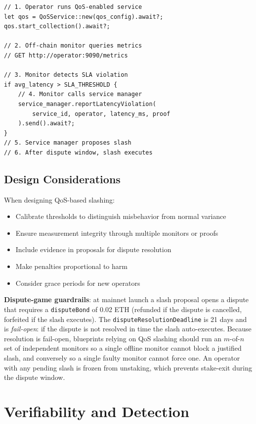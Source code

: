 \documentclass[11pt,a4paper]{article}
\begin{document}
\begin{lstlisting}
// 1. Operator runs QoS-enabled service
let qos = QoSService::new(qos_config).await?;
qos.start_collection().await?;

// 2. Off-chain monitor queries metrics
// GET http://operator:9090/metrics

// 3. Monitor detects SLA violation
if avg_latency > SLA_THRESHOLD {
    // 4. Monitor calls service manager
    service_manager.reportLatencyViolation(
        service_id, operator, latency_ms, proof
    ).send().await?;
}
// 5. Service manager proposes slash
// 6. After dispute window, slash executes
\end{lstlisting}

\subsection{Design Considerations}

When designing QoS-based slashing:
\begin{itemize}[noitemsep]
    \item Calibrate thresholds to distinguish misbehavior from normal variance
    \item Ensure measurement integrity through multiple monitors or proofs
    \item Include evidence in proposals for dispute resolution
    \item Make penalties proportional to harm
    \item Consider grace periods for new operators
\end{itemize}

\textbf{Dispute-game guardrails}: at mainnet launch a slash proposal opens a dispute that requires a \texttt{disputeBond} of 0.02 ETH (refunded if the dispute is cancelled, forfeited if the slash executes). The \texttt{disputeResolutionDeadline} is 21 days and is \emph{fail-open}: if the dispute is not resolved in time the slash auto-executes. Because resolution is fail-open, blueprints relying on QoS slashing should run an $m$-of-$n$ set of independent monitors so a single offline monitor cannot block a justified slash, and conversely so a single faulty monitor cannot force one. An operator with any pending slash is frozen from unstaking, which prevents stake-exit during the dispute window.

\section{Verifiability and Detection}
\end{document}
